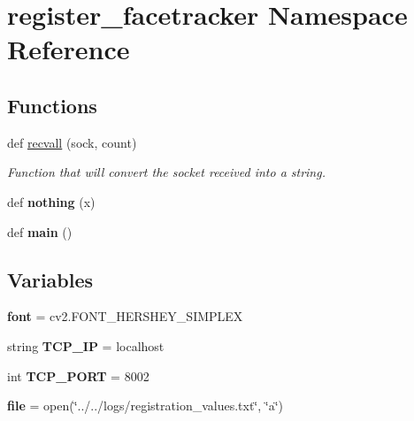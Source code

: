 \hypertarget{namespaceregister__facetracker}{}\section{register\+\_\+facetracker Namespace Reference}
\label{namespaceregister__facetracker}
\subsection*{Functions}
\begin{DoxyCompactItemize}
\item 
def \hyperlink{namespaceregister__facetracker_a7e7317697e2ec6c09ed19d2be249da48}{recvall} (sock, count)
\begin{DoxyCompactList}\small\item\em Function that will convert the socket received into a string. \end{DoxyCompactList}\item 
def {\bfseries nothing} (x)\hypertarget{namespaceregister__facetracker_a57f98feb429c779ea1963c03945103dd}{}\label{namespaceregister__facetracker_a57f98feb429c779ea1963c03945103dd}

\item 
def {\bfseries main} ()\hypertarget{namespaceregister__facetracker_a2020aecd0ed90359b49d4f16e5b469c9}{}\label{namespaceregister__facetracker_a2020aecd0ed90359b49d4f16e5b469c9}

\end{DoxyCompactItemize}
\subsection*{Variables}
\begin{DoxyCompactItemize}
\item 
{\bfseries font} = cv2.\+F\+O\+N\+T\+\_\+\+H\+E\+R\+S\+H\+E\+Y\+\_\+\+S\+I\+M\+P\+L\+EX\hypertarget{namespaceregister__facetracker_a40fd762d6e26811e038be5b5eabb4aef}{}\label{namespaceregister__facetracker_a40fd762d6e26811e038be5b5eabb4aef}

\item 
string {\bfseries T\+C\+P\+\_\+\+IP} = \textquotesingle{}localhost\textquotesingle{}\hypertarget{namespaceregister__facetracker_a8d029fb157738c48373876bb27ac948a}{}\label{namespaceregister__facetracker_a8d029fb157738c48373876bb27ac948a}

\item 
int {\bfseries T\+C\+P\+\_\+\+P\+O\+RT} = 8002\hypertarget{namespaceregister__facetracker_aff2158cc5bc813254a9b6253552907f7}{}\label{namespaceregister__facetracker_aff2158cc5bc813254a9b6253552907f7}

\item 
{\bfseries file} = open(\char`\"{}../../logs/registration\+\_\+values.\+txt\char`\"{}, \char`\"{}a\char`\"{})\hypertarget{namespaceregister__facetracker_a89f807184e61b9d93eef7c2c0a034fdc}{}\label{namespaceregister__facetracker_a89f807184e61b9d93eef7c2c0a034fdc}

\end{DoxyCompactItemize}


